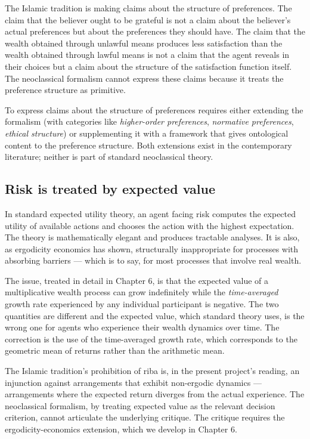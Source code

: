 The Islamic tradition is making claims about the structure of
preferences. The claim that the believer ought to be grateful is not
a claim about the believer's actual preferences but about the
preferences they should have. The claim that the wealth obtained
through unlawful means produces less satisfaction than the wealth
obtained through lawful means is not a claim that the agent reveals
in their choices but a claim about the structure of the satisfaction
function itself. The neoclassical formalism cannot express these
claims because it treats the preference structure as primitive.

To express claims about the structure of preferences requires either
extending the formalism (with categories like
\emph{higher-order preferences}, \emph{normative preferences},
\emph{ethical structure}) or supplementing it with a framework that
gives ontological content to the preference structure. Both extensions
exist in the contemporary literature; neither is part of standard
neoclassical theory.

\subsection{Risk is treated by expected value}

In standard expected utility theory, an agent facing risk computes
the expected utility of available actions and chooses the action
with the highest expectation. The theory is mathematically elegant
and produces tractable analyses. It is also, as ergodicity economics
has shown, structurally inappropriate for processes with absorbing
barriers --- which is to say, for most processes that involve real
wealth.

The issue, treated in detail in Chapter 6, is that the expected value
of a multiplicative wealth process can grow indefinitely while the
\emph{time-averaged} growth rate experienced by any individual
participant is negative. The two quantities are different and the
expected value, which standard theory uses, is the wrong one for
agents who experience their wealth dynamics over time. The
correction is the use of the time-averaged growth rate, which
corresponds to the geometric mean of returns rather than the
arithmetic mean.

The Islamic tradition's prohibition of riba is, in the present
project's reading, an injunction against arrangements that exhibit
non-ergodic dynamics --- arrangements where the expected return
diverges from the actual experience. The neoclassical formalism, by
treating expected value as the relevant decision criterion, cannot
articulate the underlying critique. The critique requires the
ergodicity-economics extension, which we develop in Chapter 6.

